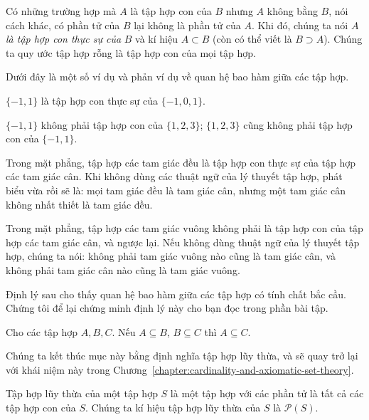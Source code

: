 Có những trường hợp mà $A$ là tập hợp con của $B$ nhưng $A$ không bằng $B$, nói cách khác, có phần tử của $B$ lại không là phần tử của $A$. Khi đó, chúng ta nói $A$ \textit{là tập hợp con thực sự của} $B$ và kí hiệu $A\subset B$ (còn có thể viết là $B\supset A$). Chúng ta quy ước tập hợp rỗng là tập hợp con của mọi tập hợp.

Dưới đây là một số ví dụ và phản ví dụ về quan hệ bao hàm giữa các tập hợp.

\begin{example}
    $\{ -1, 1 \}$ là tập hợp con thực sự của $\{ -1, 0, 1 \}$.
\end{example}

\begin{counterexample}
    $\{ -1, 1 \}$ không phải tập hợp con của $\{ 1, 2, 3 \}$; $\{ 1, 2, 3 \}$ cũng không phải tập hợp con của $\{ -1, 1 \}$.
\end{counterexample}

\begin{example}
    Trong mặt phẳng, tập hợp các tam giác đều là tập hợp con thực sự của tập hợp các tam giác cân. Khi không dùng các thuật ngữ của lý thuyết tập hợp, phát biểu vừa rồi sẽ là: mọi tam giác đều là tam giác cân, nhưng một tam giác cân không nhất thiết là tam giác đều.
\end{example}

\begin{counterexample}
    Trong mặt phẳng, tập hợp các tam giác vuông không phải là tập hợp con của tập hợp các tam giác cân, và ngược lại. Nếu không dùng thuật ngữ của lý thuyết tập hợp, chúng ta nói: không phải tam giác vuông nào cũng là tam giác cân, và không phải tam giác cân nào cũng là tam giác vuông.
\end{counterexample}

Định lý sau cho thấy quan hệ bao hàm giữa các tập hợp có tính chất bắc cầu. Chứng tôi để lại chứng minh định lý này cho bạn đọc trong phần bài tập.

\begin{theorem}
    Cho các tập hợp $A, B, C$. Nếu $A\subseteq B$, $B\subseteq C$ thì $A\subseteq C$.
\end{theorem}

Chúng ta kết thúc mục này bằng định nghĩa tập hợp lũy thừa, và sẽ quay trở lại với khái niệm này trong Chương~\ref{chapter:cardinality-and-axiomatic-set-theory}.

\begin{definition}
    Tập hợp lũy thừa của một tập hợp $S$ là một tập hợp với các phần tử là tất cả các tập hợp con của $S$. Chúng ta kí hiệu tập hợp lũy thừa của $S$ là $\mathcal{P}(S)$.
\end{definition}

